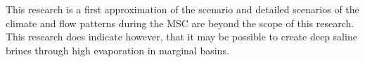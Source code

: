 \documentclass[twocolumn]{article}
\begin{document}
This research is a first approximation of the scenario and detailed scenarios of the climate and flow patterns during the MSC are beyond the scope of this research. This research does indicate however, that it may be possible to create deep saline brines through high evaporation in marginal basins.





\end{document}
